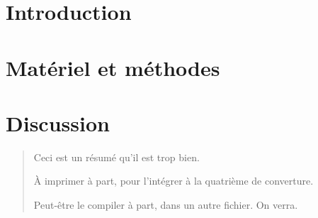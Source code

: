 \documentclass[a4paper, 12pt, linktocpage=true, oneside]{memoir}
\renewcommand{\baselinestretch}{1.5}
\begin{document}
\maketitle
\tableofcontents

\chapter{Introduction}


\chapter{Matériel et méthodes}


\chapter{Discussion}


\printbibliography

\newpage
\pagestyle{empty}
\renewcommand{\baselinestretch}{1} %
\begin{abstract}
Ceci est un résumé qu'il est trop bien.

À imprimer à part, pour l'intégrer à la quatrième de converture.

Peut-être le compiler à part, dans un autre fichier. On verra.
\end{abstract}
\end{document}
